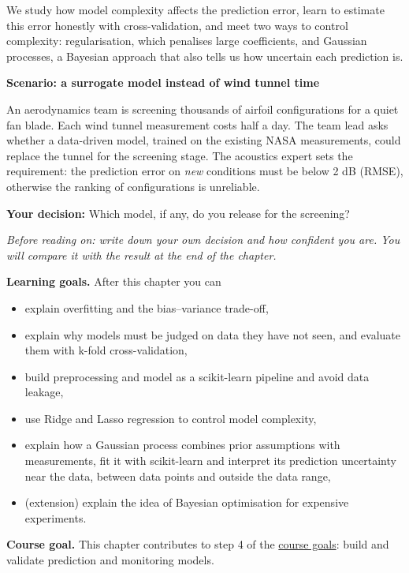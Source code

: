 \documentclass[
  letterpaper,
  DIV=11,
  numbers=noendperiod]{scrreprt}
\providecommand{\tightlist}{%
  \setlength{\itemsep}{0pt}\setlength{\parskip}{0pt}}\usepackage{longtable,booktabs,array}
\begin{document}
We study how model complexity affects the prediction error, learn to
estimate this error honestly with cross-validation, and meet two ways to
control complexity: regularisation, which penalises large coefficients,
and Gaussian processes, a Bayesian approach that also tells us how
uncertain each prediction is.

\textbf{Scenario: a surrogate model instead of wind tunnel time}

An aerodynamics team is screening thousands of airfoil configurations
for a quiet fan blade. Each wind tunnel measurement costs half a day.
The team lead asks whether a data-driven model, trained on the existing
NASA measurements, could replace the tunnel for the screening stage. The
acoustics expert sets the requirement: the prediction error on
\emph{new} conditions must be below 2 dB (RMSE), otherwise the ranking
of configurations is unreliable.

\textbf{Your decision:} Which model, if any, do you release for the
screening?

\emph{Before reading on: write down your own decision and how confident
you are. You will compare it with the result at the end of the chapter.}

\textbf{Learning goals.} After this chapter you can

\begin{itemize}
\tightlist
\item
  explain overfitting and the bias--variance trade-off,
\item
  explain why models must be judged on data they have not seen, and
  evaluate them with k-fold cross-validation,
\item
  build preprocessing and model as a scikit-learn pipeline and avoid
  data leakage,
\item
  use Ridge and Lasso regression to control model complexity,
\item
  explain how a Gaussian process combines prior assumptions with
  measurements, fit it with scikit-learn and interpret its prediction
  uncertainty near the data, between data points and outside the data
  range,
\item
  (extension) explain the idea of Bayesian optimisation for expensive
  experiments.
\end{itemize}

\textbf{Course goal.} This chapter contributes to step 4 of the
\hyperref[what-you-will-be-able-to-do]{course goals}: build and validate
prediction and monitoring models.
\end{document}
